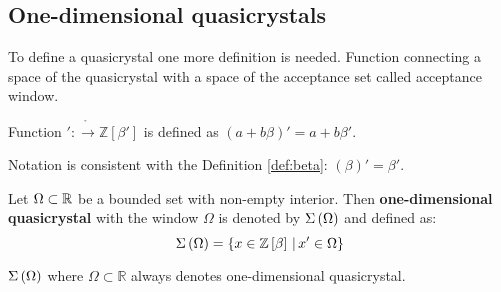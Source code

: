 \documentclass[text.tex]{subfiles}
\begin{document}
\subsection{One-dimensional quasicrystals}

To define a quasicrystal one more definition is needed. Function connecting a space of the quasicrystal with a space of the acceptance set called acceptance window.

\begin{definition}
Function $':\ring\to\mathbb{Z}[\beta']$ is defined as $(a+b\beta)' = a+b\beta'$.
\end{definition}
\begin{remark}
Notation is consistent with the Definition \ref{def:beta}: $(\beta)'=\beta'$.
\end{remark}

\begin{definition}
\label{def_oneDimension}
Let $\Omega \subset \mathbb{R}$ be a bounded set with non-empty interior. Then \textbf{one-dimensional quasicrystal} with the window $\Omega$ is denoted by $\Sigma\left(\Omega\right)$ and defined as:
$$\Sigma\left(\Omega\right) = \{ x\in \mathbb{Z}\left[\beta\right] \,|\, x'\in \Omega\}$$
\end{definition}

\begin{remark}
$\Sigma\left(\Omega\right)$ where $\Omega \subset \mathbb{R}$ always denotes one-dimensional quasicrystal.
\end{remark}
\end{document}
